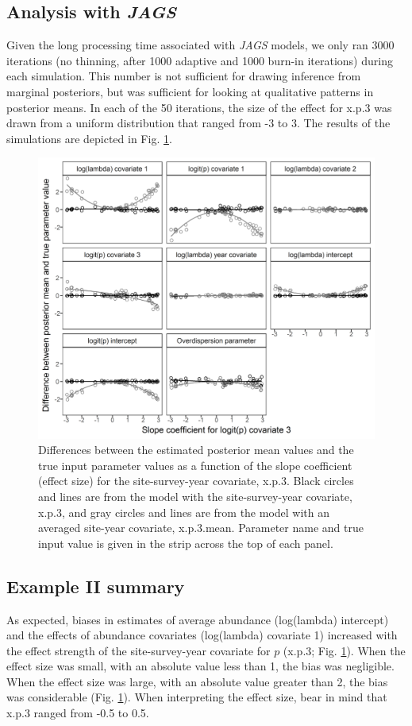 \documentclass{article}
\begin{document}
\subsection[Analysis with JAGS]{Analysis with \emph{JAGS}}
Given the long processing time associated with \emph{JAGS} models, we only ran 3000 iterations (no thinning, after 1000 adaptive and 1000 burn-in iterations) during each simulation. This number is not sufficient for drawing inference from marginal posteriors, but was sufficient for looking at qualitative patterns in posterior means. In each of the 50 iterations, the size of the effect for x.p.3 was drawn from a uniform distribution that ranged from -3 to 3. The results of the simulations are depicted in Fig. \ref{fig:fig2}.

\begin{figure}
  \includegraphics[width=\linewidth]{fig2.png}
  \caption{Differences between the estimated posterior mean values and the true input parameter values as a function of the slope coefficient (effect size) for the site-survey-year covariate, x.p.3. Black circles and lines are from the model with the site-survey-year covariate, x.p.3, and gray circles and lines are from the model with an averaged site-year covariate, x.p.3.mean. Parameter name and true input value is given in the strip across the top of each panel.}
  \label{fig:fig2}
\end{figure}

\subsection[Example II summary]{Example II summary}
As expected, biases in estimates of average abundance (log(lambda) intercept) and the effects of abundance covariates (log(lambda) covariate 1) increased with the effect strength of the site-survey-year covariate for $p$ (x.p.3;  Fig. \ref{fig:fig2}). When the effect size was small, with an absolute value less than 1, the bias was negligible. When the effect size was large, with an absolute value greater than 2, the bias was considerable (Fig. \ref{fig:fig2}). When interpreting the effect size, bear in mind that x.p.3 ranged from -0.5 to 0.5.
\end{document}
